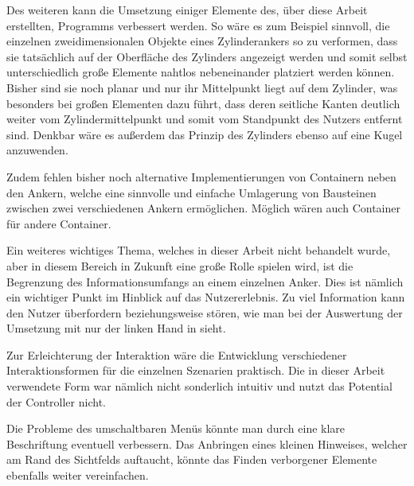		
		Des weiteren kann die Umsetzung einiger Elemente des, über diese Arbeit erstellten, Programms verbessert werden. So wäre es zum Beispiel sinnvoll, die einzelnen zweidimensionalen Objekte eines Zylinderankers so zu verformen, dass sie tatsächlich auf der Oberfläche des Zylinders angezeigt werden und somit selbst unterschiedlich große Elemente nahtlos nebeneinander platziert werden können. Bisher sind sie noch planar und nur ihr Mittelpunkt  liegt auf dem Zylinder, was besonders bei großen Elementen dazu führt, dass deren seitliche Kanten deutlich weiter vom Zylindermittelpunkt und somit vom Standpunkt des Nutzers entfernt sind.
		Denkbar wäre es außerdem das Prinzip des Zylinders ebenso auf eine Kugel anzuwenden.
		
		
		Zudem fehlen bisher noch alternative Implementierungen von Containern neben den Ankern, welche eine sinnvolle und einfache Umlagerung von Bausteinen zwischen zwei verschiedenen Ankern ermöglichen. Möglich wären auch Container für andere Container.
				
		
		Ein weiteres wichtiges Thema, welches in dieser Arbeit nicht behandelt wurde, aber in diesem Bereich in Zukunft eine große Rolle spielen wird, ist die Begrenzung des Informationsumfangs an einem einzelnen Anker. Dies ist nämlich ein wichtiger Punkt im Hinblick auf das Nutzererlebnis. Zu viel Information kann den Nutzer überfordern beziehungsweise stören, wie man bei der Auswertung der Umsetzung mit nur der linken Hand in  sieht.
		
		
		Zur Erleichterung der Interaktion wäre die Entwicklung verschiedener Interaktionsformen für die einzelnen Szenarien praktisch. Die in dieser Arbeit verwendete Form war nämlich nicht sonderlich intuitiv und nutzt das Potential der Controller nicht.
		
		
		Die Probleme des umschaltbaren Menüs könnte man durch eine klare Beschriftung eventuell verbessern. Das Anbringen eines kleinen Hinweises, welcher am Rand des Sichtfelds auftaucht, könnte das Finden verborgener Elemente ebenfalls weiter vereinfachen.
	
		
